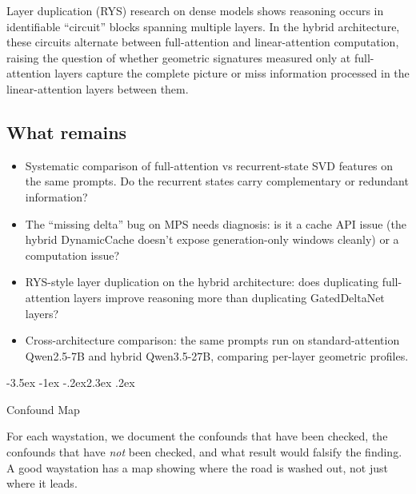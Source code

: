 \documentclass[11pt,a4paper]{article}
\makeatletter
\renewcommand\section{\@startsection{section}{1}{\z@}%
  {-3.5ex \@plus -1ex \@minus -.2ex}{2.3ex \@plus.2ex}%
  {\normalfont\Large\bfseries\raggedright}}
\makeatother
\begin{document}
Layer duplication (RYS) research on dense models shows reasoning
occurs in identifiable ``circuit'' blocks spanning multiple layers.
In the hybrid architecture, these circuits alternate between
full-attention and linear-attention computation, raising the question
of whether geometric signatures measured only at full-attention layers
capture the complete picture or miss information processed in the
linear-attention layers between them.

\subsection{What remains}

\begin{itemize}[nosep]
\item Systematic comparison of full-attention vs recurrent-state
  SVD features on the same prompts. Do the recurrent states carry
  complementary or redundant information?
\item The ``missing delta'' bug on MPS needs diagnosis: is it a cache
  API issue (the hybrid DynamicCache doesn't expose generation-only
  windows cleanly) or a computation issue?
\item RYS-style layer duplication on the hybrid architecture: does
  duplicating full-attention layers improve reasoning more than
  duplicating GatedDeltaNet layers?
\item Cross-architecture comparison: the same prompts run on
  standard-attention Qwen2.5-7B and hybrid Qwen3.5-27B, comparing
  per-layer geometric profiles.
\end{itemize}

\section{Confound Map}

For each waystation, we document the confounds that have been checked,
the confounds that have \emph{not} been checked, and what result would
falsify the finding. A good waystation has a map showing where the road
is washed out, not just where it leads.
\end{document}

